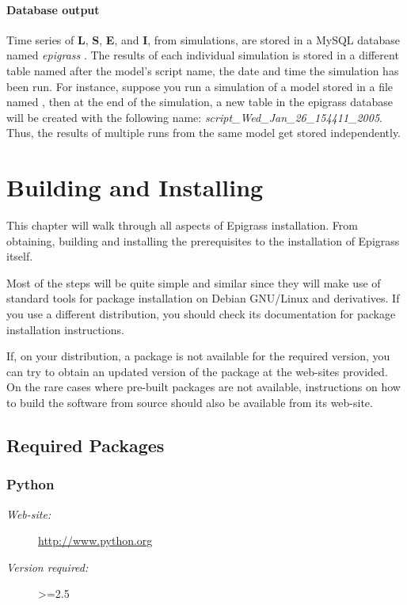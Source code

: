 \documentclass[a4paper,10pt]{manual}
\begin{document}
\subsubsection{Database output}
Time series of \textbf{L}, \textbf{S}, \textbf{E}, and \textbf{I}, from simulations, are stored in a MySQL database named \emph{epigrass} . The results of each individual simulation is stored in a different table named after the model's script name, the date and time the simulation has been run. For instance, suppose you run a simulation of a model stored in a file named , then at the end of the simulation, a new table in the epigrass database will be created with the following name: \emph{script\_Wed\_Jan\_26\_154411\_2005}. Thus, the results of multiple runs from the same model get stored independently.
\resetcurrentobjects


\hypertarget{install}{}\chapter{Building and Installing}

This chapter will walk through all aspects of Epigrass installation. From obtaining, building and installing  the prerequisites to the installation of Epigrass itself.

Most of the steps will be quite simple and similar since they will make use of standard tools for package installation on Debian GNU/Linux and derivatives. If you use a different distribution, you should check its documentation for package installation instructions.

If, on your distribution, a package is not available for the required version, you can try to obtain an updated version of the package at the web-sites provided. On the rare cases where pre-built packages are not available, instructions on how to build the software from source should also be available from its web-site.


\section{Required Packages}


\subsection{Python}
\begin{description}
\item[\emph{Web-site:}]
\href{http://www.python.org}{http://www.python.org}

\item[\emph{Version required:}]
\textgreater{}=2.5

\end{description}
\end{document}
